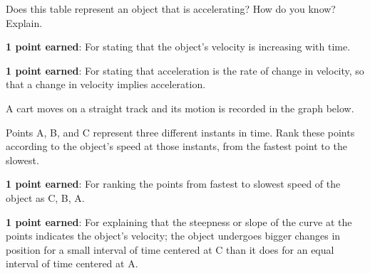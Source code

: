 \documentclass[answers]{exam}
\begin{document}
\begin{questions}
Does this table represent an object that is accelerating? How do you know? Explain.

\fillwithlines{3cm}

\begin{solutionorbox}
\phantom{.}

\textbf{1 point earned}: For stating that the object's velocity is increasing with time.

\textbf{1 point earned}: For stating that acceleration is the rate of change in velocity, so that a change in velocity implies acceleration.
\end{solutionorbox}

\question [2]
A cart moves on a straight track and its motion is recorded in the graph below.

\begin{center}
\end{center}

Points A, B, and C represent three different instants in time. Rank these points according to the object's speed at those instants, from the fastest point to the slowest.

\begin{solutionorbox}[6cm]
\phantom{.}

\textbf{1 point earned}: For ranking the points from fastest to slowest speed of the object as C, B, A. 

\textbf{1 point earned}: For explaining that the steepness or slope of the curve at the points indicates the object's velocity; the object undergoes bigger changes in position for a small interval of time centered at C than it does for an equal interval of time centered at A.
\end{solutionorbox}

\clearpage

{\large
\printkeytable
}
\end{questions}
\end{document}

